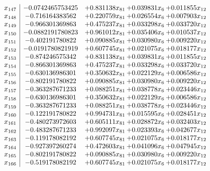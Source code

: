 \documentclass[11pt]{article}
\begin{document}
\[\begin{array}{c| c c@{\hskip 2pt} c@{\hskip 2pt} c@{\hskip 2pt} }
 x_{147}   &  -0.0742465753425 & + 0.831138 x_{81} & + 0.039831 x_{6} & + 0.011855 x_{12}\\
 x_{148}   &  -0.716164383562 & + 0.220759 x_{81} & + 0.026554 x_{6} & + 0.007903 x_{12}\\
 x_{149}   &  -0.966301369863 & + 0.475237 x_{81} & + 0.033298 x_{6} & + 0.033720 x_{12}\\
 x_{150}   &  -0.0882191780823 & + 0.961012 x_{81} & + 0.035406 x_{6} & + 0.010537 x_{12}\\
 x_{151}   &  -0.402191780822 & + 0.090885 x_{81} & + 0.030980 x_{6} & + 0.009220 x_{12}\\
 x_{152}   &  -0.0191780821919 & + 0.607745 x_{81} & + 0.021075 x_{6} & + 0.018177 x_{12}\\
 x_{153}   &  -0.874246575342 & + 0.831138 x_{81} & + 0.039831 x_{6} & + 0.011855 x_{12}\\
 x_{154}   &  -0.866301369863 & + 0.475237 x_{81} & + 0.033298 x_{6} & + 0.033720 x_{12}\\
 x_{155}   &  -0.630136986301 & + 0.350632 x_{81} & + 0.022129 x_{6} & + 0.006586 x_{12}\\
 x_{156}   &  -0.802191780822 & + 0.090885 x_{81} & + 0.030980 x_{6} & + 0.009220 x_{12}\\
 x_{157}   &  -0.363287671233 & + 0.088251 x_{81} & + 0.038778 x_{6} & + 0.023446 x_{12}\\
 x_{158}   &  -0.630136986301 & + 0.350632 x_{81} & + 0.022129 x_{6} & + 0.006586 x_{12}\\
 x_{159}   &  -0.363287671233 & + 0.088251 x_{81} & + 0.038778 x_{6} & + 0.023446 x_{12}\\
 x_{160}   &  -0.122191780822 & + 0.994731 x_{81} & + 0.015595 x_{6} & + 0.028451 x_{12}\\
 x_{161}   &  -0.480273972603 & + 0.605111 x_{81} & + 0.028872 x_{6} & + 0.032403 x_{12}\\
 x_{162}   &  -0.483287671233 & + 0.992097 x_{81} & + 0.023393 x_{6} & + 0.042677 x_{12}\\
 x_{163}   &  -0.119178082192 & + 0.607745 x_{81} & + 0.021075 x_{6} & + 0.018177 x_{12}\\
 x_{164}   &  -0.927397260274 & + 0.472603 x_{81} & + 0.041096 x_{6} & + 0.047945 x_{12}\\
 x_{165}   &  -0.802191780822 & + 0.090885 x_{81} & + 0.030980 x_{6} & + 0.009220 x_{12}\\
 x_{166}   &  -0.519178082192 & + 0.607745 x_{81} & + 0.021075 x_{6} & + 0.018177 x_{12}\\

\end{array}\]
\end{document}
